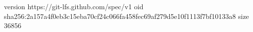 version https://git-lfs.github.com/spec/v1
oid sha256:2a157a4f0eb3c15eba70cf24c066fa458fec69af279d5e10f1113f7bf10133a8
size 36856
